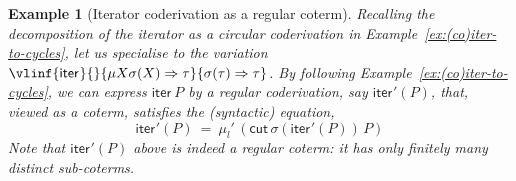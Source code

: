 \documentclass[10pt,a4paper]{amsart}
\theoremstyle{plain}
\newtheorem{example}[example]{Example}
\theoremstyle{definition}
\newtheorem{remark}[remark]{Remark}
\newcommand{\dfn}{:=}
\newcommand{\anupam}[1]{\todo[color=green]{A: #1}}
\renewcommand{\todo}[1]{}
\renewcommand{\anupam}[1]{}
\theoremstyle{plain}
\theoremstyle{definition} %
\newcommand{\closure}[1]{\langle #1 \rangle}
\newcommand{\Sys}[1]{\mathcal E_{#1}}
\newcommand{\arrow}{\to}
\newcommand{\seqar}{\Rightarrow}
\newcommand{\mulunf}{\lr \mu'}
\newcommand{\iter}[1]{\mathsf{iter}_{#1}}
\newcommand{\infrule}{\mathsf{r}}
\newcommand{\rrule}{\infrule} %
\newcommand{\id}{\mathsf{id}}
\newcommand{\cut}{\mathsf{cut}}
\newcommand{\lr}[1]{#1_l}
\newcommand{\LJ}{\mathsf{LJ}}
\newcommand{\muLJ}{\mu\LJ}
\newcommand{\circular}{\mathsf C}
\newcommand{\cmuLJ}{\circular\muLJ}
\newcommand{\der}{P}
\newcommand{\deri}{Q}
\begin{document}
\begin{example}
    [Iterator coderivation as a regular coterm]
    \label{ex:iter-coder-as-coterm}
    Recalling the decomposition of the iterator as a circular coderivation in Example~\ref{ex:(co)iter-to-cycles}, let us specialise to the variation $    \vlinf{\iter{}}{}{\mu X \sigma(X)\seqar \tau}{\sigma(\tau)\seqar \tau}$.
 By following Example~\ref{ex:(co)iter-to-cycles}, we can express $\iter{}\, \der$
    by a regular coderivation, say $\iter{}'(\der)$, that, viewed as a coterm, satisfies the (syntactic) equation,
    \begin{equation}
        \label{eq:iter-coder-syntactic-eqn}
        \iter{}'(\der)\ = \ \mulunf\, (\cut\, \sigma(\iter{}'(\der))\, \der)
    \end{equation}
    Note that $\iter{}'(\der)$ above is indeed a \emph{regular} coterm: it has only finitely many distinct sub-coterms.
\end{example}

\anupam{commented `regular coterms' below}


\end{document}
